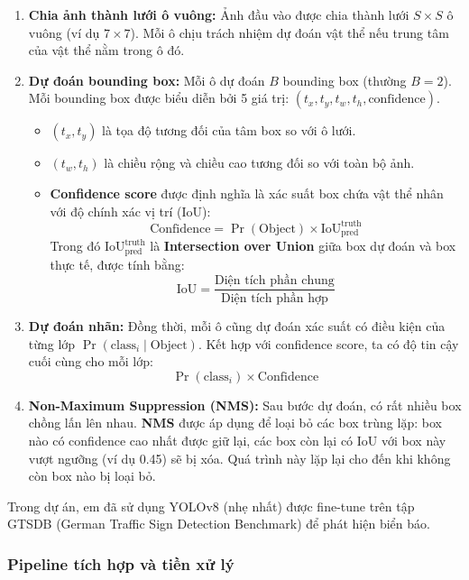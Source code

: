 \documentclass[12pt,a4paper]{article}
\begin{document}
\begin{enumerate}
    \item \textbf{Chia ảnh thành lưới ô vuông:} Ảnh đầu vào được chia thành lưới $S \times S$ ô vuông (ví dụ $7 \times 7$). Mỗi ô chịu trách nhiệm dự đoán vật thể nếu trung tâm của vật thể nằm trong ô đó.
    
    \item \textbf{Dự đoán bounding box:} Mỗi ô dự đoán $B$ bounding box (thường $B=2$). Mỗi bounding box được biểu diễn bởi 5 giá trị: $(t_x, t_y, t_w, t_h, \text{confidence})$.
    \begin{itemize}
        \item $(t_x, t_y)$ là tọa độ tương đối của tâm box so với ô lưới.
        \item $(t_w, t_h)$ là chiều rộng và chiều cao tương đối so với toàn bộ ảnh.
        \item \textbf{Confidence score} được định nghĩa là xác suất box chứa vật thể nhân với độ chính xác vị trí (IoU):
        \[
            \text{Confidence} = \Pr(\text{Object}) \times \text{IoU}_{\text{pred}}^{\text{truth}}
        \]
        Trong đó $\text{IoU}_{\text{pred}}^{\text{truth}}$ là \textbf{Intersection over Union} giữa box dự đoán và box thực tế, được tính bằng:
        \[
            \text{IoU} = \frac{\text{Diện tích phần chung}}{\text{Diện tích phần hợp}}
        \]
    \end{itemize}
    
    \item \textbf{Dự đoán nhãn:} Đồng thời, mỗi ô cũng dự đoán xác suất có điều kiện của từng lớp $\Pr(\text{class}_i \mid \text{Object})$. Kết hợp với confidence score, ta có độ tin cậy cuối cùng cho mỗi lớp:
    \[
        \Pr(\text{class}_i) \times \text{Confidence}
    \]
    
    \item \textbf{Non-Maximum Suppression (NMS):} Sau bước dự đoán, có rất nhiều box chồng lấn lên nhau. \textbf{NMS} được áp dụng để loại bỏ các box trùng lặp: box nào có confidence cao nhất được giữ lại, các box còn lại có IoU với box này vượt ngưỡng (ví dụ 0.45) sẽ bị xóa. Quá trình này lặp lại cho đến khi không còn box nào bị loại bỏ.
\end{enumerate}

Trong dự án, em đã sử dụng YOLOv8 (nhẹ nhất) được fine-tune trên tập GTSDB (German Traffic Sign Detection Benchmark) để phát hiện biển báo.

\subsubsection*{Pipeline tích hợp và tiền xử lý}
\end{document}
